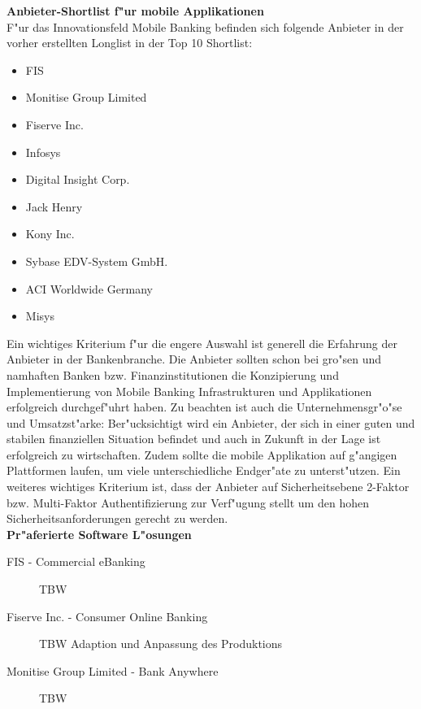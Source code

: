 \textbf{Anbieter-Shortlist f"ur mobile Applikationen}\\
F"ur das Innovationsfeld Mobile Banking befinden sich folgende Anbieter in der vorher erstellten Longlist in der Top 10 Shortlist:

\begin{itemize}
	\item FIS
	\item Monitise Group Limited
	\item Fiserve Inc.
	\item Infosys
	\item Digital Insight Corp.
	\item Jack Henry
	\item Kony Inc.
	\item Sybase EDV-System GmbH.
	\item ACI Worldwide Germany
	\item Misys
\end{itemize}

Ein wichtiges Kriterium f"ur die engere Auswahl ist generell die Erfahrung der Anbieter in der Bankenbranche. Die Anbieter sollten schon bei gro"sen und namhaften Banken bzw. Finanzinstitutionen die Konzipierung und Implementierung von Mobile	 Banking Infrastrukturen und Applikationen erfolgreich durchgef"uhrt haben. Zu beachten ist auch die Unternehmensgr"o"se und Umsatzst"arke: Ber"ucksichtigt wird ein Anbieter, der sich in einer guten und stabilen finanziellen Situation befindet und auch in Zukunft in der Lage ist erfolgreich zu wirtschaften. Zudem sollte die mobile Applikation auf g"angigen Plattformen laufen, um viele unterschiedliche Endger"ate zu unterst"utzen. Ein weiteres wichtiges Kriterium ist, dass der Anbieter auf Sicherheitsebene 2-Faktor bzw. Multi-Faktor Authentifizierung zur Verf"ugung stellt um den hohen Sicherheitsanforderungen gerecht zu werden.\\

\textbf{Pr"aferierte Software L"osungen}
\begin{description}

	\item[FIS - Commercial eBanking]   TBW
	
	\item[Fiserve Inc. - Consumer Online Banking]   TBW Adaption und Anpassung des Produktions 
	
	\item[Monitise Group Limited - Bank Anywhere]   TBW
	
\end{description}